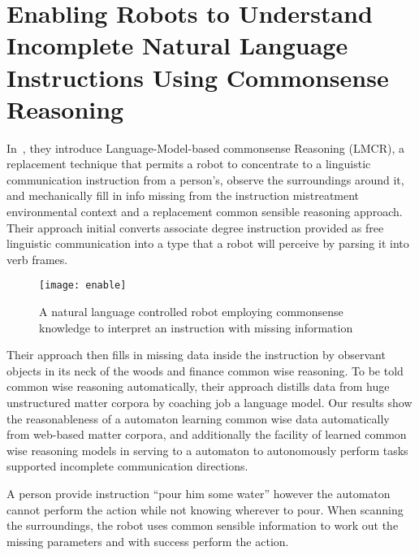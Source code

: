 \section{Enabling Robots to Understand Incomplete Natural Language Instructions Using Commonsense Reasoning}
In~\cite{DBLP:journals/corr/TesslerGZMM16}, they introduce Language-Model-based commonsense Reasoning (LMCR), a replacement technique that permits a robot to concentrate to a linguistic communication instruction from a person's, observe the surroundings around it, and mechanically fill in info missing from the instruction mistreatment environmental context and a replacement common sensible reasoning approach. Their approach initial converts associate degree instruction provided as free linguistic communication into a type that a robot will perceive by parsing it into verb frames.

\begin{figure}[htbp]
    
    \texttt{[image: enable]}
    \caption{A natural language controlled robot employing commonsense knowledge to interpret an instruction with missing information~\cite{DBLP:journals/corr/TesslerGZMM16} }
    \label{fig:enable}
\end{figure}
\newpage
Their approach then fills in missing data inside the instruction by observant objects in its neck of the woods and finance common wise reasoning. To be told common wise reasoning automatically, their approach distills data from huge unstructured matter corpora by coaching job a language model. Our results show the reasonableness of a automaton learning common wise data automatically from web-based matter corpora, and additionally the facility of learned common wise reasoning models in serving to a automaton to autonomously perform tasks supported incomplete communication directions.

A person provide instruction “pour him some water” however the automaton cannot perform the action while not knowing wherever to pour. When scanning the surroundings, the robot uses common sensible information to work out the missing parameters and with success perform the action.


